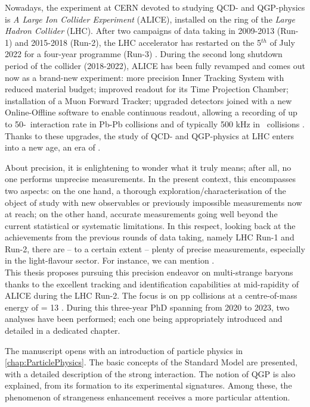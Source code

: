 Nowadays, the experiment at CERN devoted to studying QCD- and QGP-physics is \textit{A Large Ion Collider Experiment} (ALICE), installed on the ring of the \textit{Large Hadron Collider} (LHC). After two campaigns of data taking in 2009-2013 (Run-1) and 2015-2018 (Run-2), the LHC accelerator has restarted on the 5$^{th}$ of July 2022 for a four-year programme (Run-3) \cite{ThirdRunLarge2023}. During the second long shutdown period of the collider (2018-2022), ALICE has been fully revamped and comes out now as a brand-new experiment: more precision Inner Tracking System with reduced material budget; improved readout for its Time Projection Chamber; installation of a Muon Forward Tracker; upgraded detectors joined with a new Online-Offline software to enable continuous readout, allowing a recording of up to 50-\kHz\ interaction rate in Pb-Pb collisions and of typically 500 kHz in \pp\ collisions \cite{alicecollaborationUpgradeALICEExperiment2014}. Thanks to these upgrades, the study of QCD- and QGP-physics at LHC enters into a new age, an era of .

About precision, it is enlightening to wonder what it truly means; after all, no one performs unprecise measurements. In the present context, this encompasses two aspects: on the one hand, a thorough exploration/characterisation of the object of study with new observables or previously impossible measurements now at reach; on the other hand, accurate measurements going well beyond the current statistical or systematic limitations.
In this respect, looking back at the achievements from the previous rounds of data taking, namely LHC Run-1 and Run-2, there are -- to a certain extent -- plenty of precise measurements, especially in the light-flavour sector. For instance, we can mention \cite{alicecollaborationCharacterizingInitialConditions2022}\cite{schotterMultidifferentialInvestigationStrangeness2023}\cite{schotterQCDLHC2022}.\\

This thesis proposes pursuing this precision endeavor on multi-strange baryons thanks to the excellent tracking and identification capabilities at mid-rapidity of ALICE during the LHC Run-2. The focus is on pp collisions at a centre-of-mass energy of \sqrtS = 13 \tev. During this three-year PhD spanning from 2020 to 2023, two analyses have been performed; each one being appropriately introduced and detailed in a dedicated chapter.

The manuscript opens with an introduction of particle physics in \chap\ref{chap:ParticlePhysics}. The basic concepts of the Standard Model are presented, with a detailed description of the strong interaction. The notion of QGP is also explained, from its formation to its experimental signatures. Among these, the phenomenon of strangeness enhancement receives a more particular attention.

